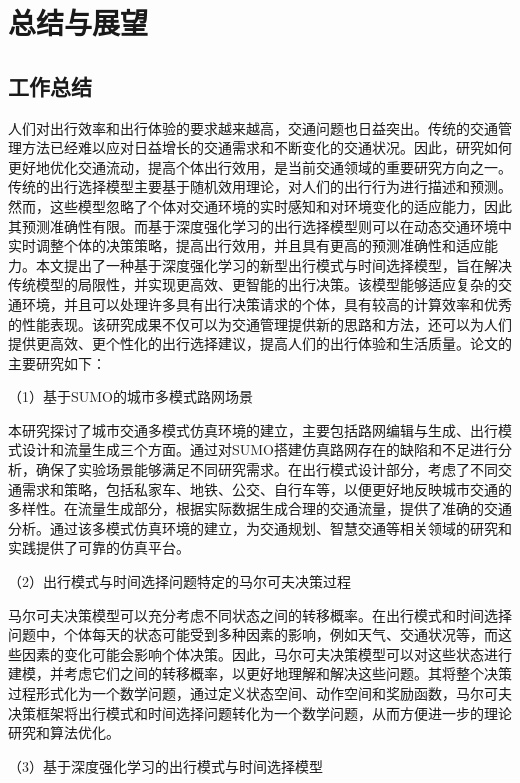 \chapter{总结与展望}
\label{chp:version_license}

\section{工作总结}

人们对出行效率和出行体验的要求越来越高，交通问题也日益突出。传统的交通管理方法已经难以应对日益增长的交通需求和不断变化的交通状况。因此，研究如何更好地优化交通流动，提高个体出行效用，是当前交通领域的重要研究方向之一。传统的出行选择模型主要基于随机效用理论，对人们的出行行为进行描述和预测。然而，这些模型忽略了个体对交通环境的实时感知和对环境变化的适应能力，因此其预测准确性有限。而基于深度强化学习的出行选择模型则可以在动态交通环境中实时调整个体的决策策略，提高出行效用，并且具有更高的预测准确性和适应能力。本文提出了一种基于深度强化学习的新型出行模式与时间选择模型，旨在解决传统模型的局限性，并实现更高效、更智能的出行决策。该模型能够适应复杂的交通环境，并且可以处理许多具有出行决策请求的个体，具有较高的计算效率和优秀的性能表现。该研究成果不仅可以为交通管理提供新的思路和方法，还可以为人们提供更高效、更个性化的出行选择建议，提高人们的出行体验和生活质量。论文的主要研究如下：

（1）基于SUMO的城市多模式路网场景

本研究探讨了城市交通多模式仿真环境的建立，主要包括路网编辑与生成、出行模式设计和流量生成三个方面。通过对SUMO搭建仿真路网存在的缺陷和不足进行分析，确保了实验场景能够满足不同研究需求。在出行模式设计部分，考虑了不同交通需求和策略，包括私家车、地铁、公交、自行车等，以便更好地反映城市交通的多样性。在流量生成部分，根据实际数据生成合理的交通流量，提供了准确的交通分析。通过该多模式仿真环境的建立，为交通规划、智慧交通等相关领域的研究和实践提供了可靠的仿真平台。

（2）出行模式与时间选择问题特定的马尔可夫决策过程

马尔可夫决策模型可以充分考虑不同状态之间的转移概率。在出行模式和时间选择问题中，个体每天的状态可能受到多种因素的影响，例如天气、交通状况等，而这些因素的变化可能会影响个体决策。因此，马尔可夫决策模型可以对这些状态进行建模，并考虑它们之间的转移概率，以更好地理解和解决这些问题。其将整个决策过程形式化为一个数学问题，通过定义状态空间、动作空间和奖励函数，马尔可夫决策框架将出行模式和时间选择问题转化为一个数学问题，从而方便进一步的理论研究和算法优化。


（3）基于深度强化学习的出行模式与时间选择模型

